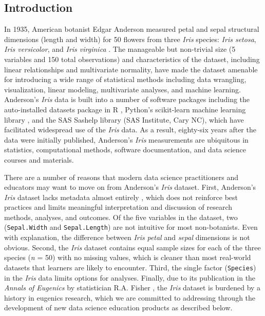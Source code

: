 \hypertarget{introduction}{%
\subsection{Introduction}\label{introduction}}

In 1935, American botanist Edgar Anderson measured petal and sepal
structural dimensions (length and width) for 50 flowers from three
\emph{Iris} species: \emph{Iris setosa}, \emph{Iris versicolor}, and
\emph{Iris virginica} \citep{anderson_irises_1935}. The manageable but
non-trivial size (5 variables and 150 total observations) and
characteristics of the dataset, including linear relationships and
multivariate normality, have made the dataset amenable for introducing a
wide range of statistical methods including data wrangling,
visualization, linear modeling, multivariate analyses, and machine
learning. Anderson's \emph{Iris} data is built into a number of software
packages including the auto-installed datasets package in R
\citep{r_core_team_r_2019}, Python's scikit-learn machine learning
library \citep{pedregosa_scikit-learn_2011}, and the SAS Sashelp library
(SAS Institute, Cary NC), which have facilitated widespread use of the
\emph{Iris} data. As a result, eighty-six years after the data were
initially published, Anderson's \emph{Iris} measurements are ubiquitous
in statistics, computational methods, software documentation, and data
science courses and materials.

There are a number of reasons that modern data science practitioners and
educators may want to move on from Anderson's \emph{Iris} dataset.
First, Anderson's \emph{Iris} dataset lacks metadata almost entirely
\citep{anderson_irises_1935}, which does not reinforce best practices
and limits meaningful interpretation and discussion of research methods,
analyses, and outcomes. Of the five variables in the dataset, two
(\texttt{Sepal.Width} and \texttt{Sepal.Length}) are not intuitive for
most non-botanists. Even with explanation, the difference between
\emph{Iris} \emph{petal} and \emph{sepal} dimensions is not obvious.
Second, the \emph{Iris} dataset contains equal sample sizes for each of
the three species (\emph{n} = 50) with no missing values, which is
cleaner than most real-world datasets that learners are likely to
encounter. Third, the single factor (\texttt{Species}) in the
\emph{Iris} data limits options for analyses. Finally, due to its
publication in the \emph{Annals of Eugenics} by statistician R.A. Fisher
\citep{fisher_use_1936}, the \emph{Iris} dataset is burdened by a
history in eugenics research, which we are committed to addressing
through the development of new data science education products as
described below.

